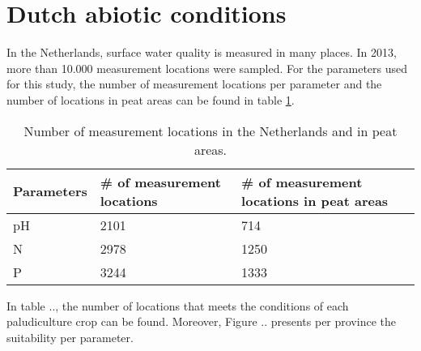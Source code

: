 \documentclass[a4paper,12pt]{scrbook}
\begin{document}

\section{Dutch abiotic conditions}

In the Netherlands, surface water quality is measured in many places. In 2013, more than 10.000 measurement locations were sampled. For the parameters used for this study, the number of measurement locations per parameter and the number of locations in peat areas can be found in table \ref{tab:abioticmeasurements}.

\begin{table}[htbp]
\caption{Number of measurement locations in the Netherlands and in peat areas.}
\begin{center}
\begin{tabular}{|p{5cm}|p{5cm}|p{5cm}|}
\hline
Parameters & \multicolumn{1}{l|}{\# of measurement locations} & \multicolumn{1}{l|}{ \# of measurement locations in peat areas} \\ \hline
pH & 2101 & 714 \\ \hline
N & 2978 & 1250 \\ \hline
P & 3244 & 1333 \\ \hline
\end{tabular}
\end{center}
\label{tab:abioticmeasurements}
\end{table}


In table .., the number of locations that meets the conditions of each paludiculture crop can be found. Moreover, Figure .. presents per province the suitability per parameter. 

\end{document}
